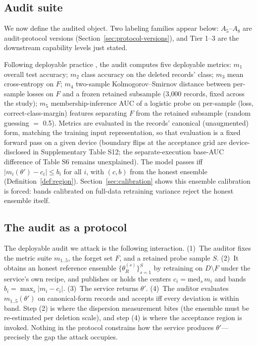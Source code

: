 \documentclass[lettersize,journal]{IEEEtran}
\begin{document}
\subsection{Audit suite}
We now define the audited object. Two labeling families appear
below: $A_5$--$A_8$ are audit-protocol versions
(Section~\ref{sec:protocol-versions}), and Tier 1--3 are the
downstream capability levels just stated.

Following deployable practice \cite{goel2022adversarial,
dorna2025openunlearning}, the audit computes five deployable metrics:
$m_1$ overall test accuracy; $m_2$ class accuracy on the deleted
records' class; $m_3$ mean cross-entropy on $F$; $m_4$ two-sample
Kolmogorov--Smirnov distance between per-sample losses on $F$ and a
frozen retained subsample (3{,}000 records, fixed across the study);
$m_5$ membership-inference AUC of a logistic probe on per-sample
(loss, correct-class-margin) features separating $F$ from the
retained subsample (random guessing $=$ 0.5). Metrics are
evaluated in the records' canonical
(unaugmented) form, matching the training input representation, so
that evaluation is a fixed forward pass on a given device
(boundary flips at the acceptance grid are device-disclosed
in Supplementary Table S12; the separate-execution base-AUC
difference of Table S6 remains unexplained). The model passes iff
$|m_i(\theta') - c_i| \le b_i$ for all $i$, with $(c,b)$ from the
honest ensemble (Definition~\ref{def:region}).
Section~\ref{sec:calibration} shows this ensemble calibration is
forced: bands calibrated on full-data retraining variance reject the
honest ensemble itself.


\subsection{The audit as a protocol}\label{sec:protocol}
The deployable audit we attack is the following interaction.
(1)~The auditor fixes the metric suite $m_{1..5}$, the forget
set $F$, and a retained probe sample $S$. (2)~It obtains an
honest reference ensemble $\{\theta_R^{(s)}\}_{s=1}^{S}$ by
retraining on $D \setminus F$ under the service's own recipe,
and publishes or holds the centers $c_i = \mathrm{med}_s\, m_i$
and bands $b_i = \max_s |m_i - c_i|$. (3)~The service returns
$\theta'$. (4)~The auditor evaluates $m_{1..5}(\theta')$ on
canonical-form records and accepts iff every deviation is
within band. Step (2) is where the dispersion measurement
bites (the ensemble must be re-estimated per deletion scale),
and step (4) is where the acceptance region is invoked.
Nothing in the protocol constrains how the service produces
$\theta'$---precisely the gap the attack occupies.
\end{document}
